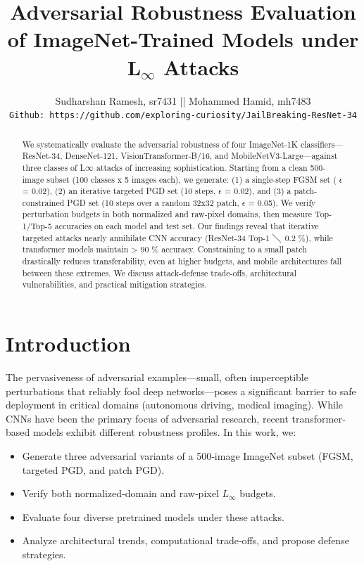 \documentclass[twoside,11pt]{article}
\begin{document}
\title{Adversarial Robustness Evaluation of ImageNet-Trained Models under L$_\infty$ Attacks}
\author{Sudharshan Ramesh, sr7431 ||
Mohammed Hamid, mh7483\\
\texttt{Github: https://github.com/exploring-curiosity/JailBreaking-ResNet-34}
}
\maketitle

\begin{abstract}
    We systematically evaluate the adversarial robustness of four ImageNet-1K classifiers—ResNet-34, DenseNet-121, VisionTransformer-B/16, and MobileNetV3-Large—against three classes of L$\infty$ attacks of increasing sophistication. Starting from a clean 500-image subset (100 classes x 5 images each), we generate: (1) a single-step FGSM set ( $\epsilon$ = 0.02), (2) an iterative targeted PGD set (10 steps,  $\epsilon$ = 0.02), and (3) a patch-constrained PGD set (10 steps over a random 32x32 patch,  $\epsilon$ = 0.05). We verify perturbation budgets in both normalized and raw-pixel domains, then measure Top-1/Top-5 accuracies on each model and test set. Our findings reveal that iterative targeted attacks nearly annihilate CNN accuracy (ResNet-34 Top-1 $\diagdown$ 0.2 \%), while transformer models maintain > 90 \% accuracy. Constraining to a small patch drastically reduces transferability, even at higher budgets, and mobile architectures fall between these extremes. We discuss attack-defense trade-offs, architectural vulnerabilities, and practical mitigation strategies.
\end{abstract}

\section{Introduction}

The pervasiveness of adversarial examples—small, often imperceptible perturbations that reliably fool deep networks—poses a significant barrier to safe deployment in critical domains (autonomous driving, medical imaging). While CNNs have been the primary focus of adversarial research, recent transformer‐based models exhibit different robustness profiles. In this work, we:
\begin{itemize}
  \item Generate three adversarial variants of a 500‑image ImageNet subset (FGSM, targeted PGD, and patch PGD).
  \item Verify both normalized‐domain and raw‐pixel \(L_\infty\) budgets.
  \item Evaluate four diverse pretrained models under these attacks.
  \item Analyze architectural trends, computational trade‑offs, and propose defense strategies.
\end{itemize}
\end{document}
